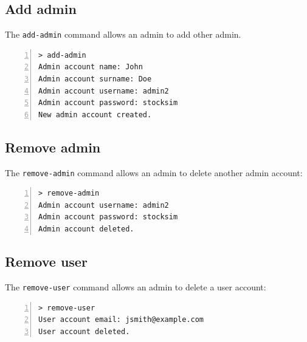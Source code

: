 \subsection{Add admin}
The \texttt{add-admin} command allows an admin to add other admin.
\begin{lstlisting}[basicstyle=\footnotesize\ttfamily,language={},numbers=left,keepspaces=true,tabsize=4,
numberstyle=\footnotesize,numbersep=8pt,frame=single]
> add-admin
Admin account name: John
Admin account surname: Doe
Admin account username: admin2
Admin account password: stocksim
New admin account created.
\end{lstlisting}
\vspace{-0.4cm}
\subsection{Remove admin}
The \texttt{remove-admin} command allows an admin to delete another admin account:
\begin{lstlisting}[basicstyle=\footnotesize\ttfamily,language={},numbers=left,keepspaces=true,tabsize=4,
numberstyle=\footnotesize,numbersep=8pt,frame=single]
> remove-admin
Admin account username: admin2
Admin account password: stocksim
Admin account deleted.
\end{lstlisting}
\vspace{-0.4cm}
\subsection{Remove user}
The \texttt{remove-user} command allows an admin to delete a user account:
\begin{lstlisting}[basicstyle=\footnotesize\ttfamily,language={},numbers=left,keepspaces=true,tabsize=4,
numberstyle=\footnotesize,numbersep=8pt,frame=single]
> remove-user
User account email: jsmith@example.com
User account deleted.
\end{lstlisting}
